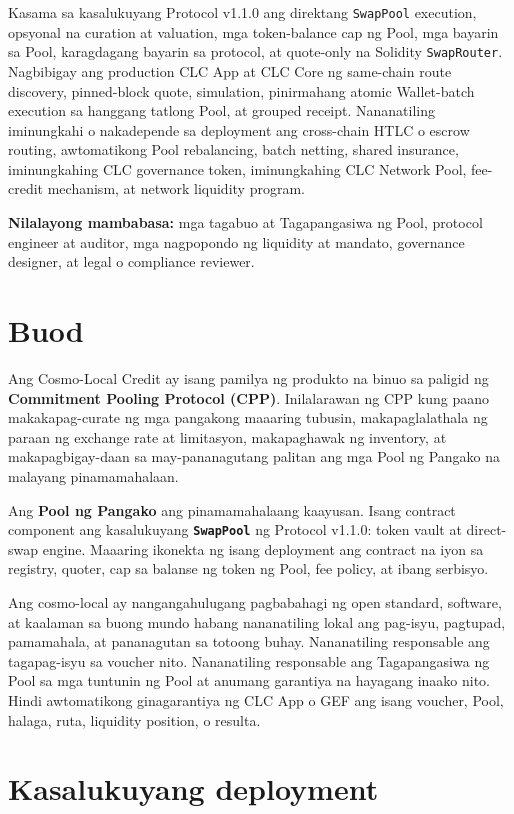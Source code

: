 \documentclass[11pt]{article}
\begin{document}
Kasama sa kasalukuyang Protocol v1.1.0 ang direktang \texttt{SwapPool} execution, opsyonal na curation at valuation, mga token-balance cap ng Pool, mga bayarin sa Pool, karagdagang bayarin sa protocol, at quote-only na Solidity \texttt{SwapRouter}. Nagbibigay ang production CLC App at CLC Core ng same-chain route discovery, pinned-block quote, simulation, pinirmahang atomic Wallet-batch execution sa hanggang tatlong Pool, at grouped receipt. Nananatiling iminungkahi o nakadepende sa deployment ang cross-chain HTLC o escrow routing, awtomatikong Pool rebalancing, batch netting, shared insurance, iminungkahing CLC governance token, iminungkahing CLC Network Pool, fee-credit mechanism, at network liquidity program.

\textbf{Nilalayong mambabasa:} mga tagabuo at Tagapangasiwa ng Pool, protocol engineer at auditor, mga nagpopondo ng liquidity at mandato, governance designer, at legal o compliance reviewer.

\section*{Buod}

Ang Cosmo-Local Credit ay isang pamilya ng produkto na binuo sa paligid ng \textbf{Commitment Pooling Protocol (CPP)}. Inilalarawan ng CPP kung paano makakapag-curate ng mga pangakong maaaring tubusin, makapaglalathala ng paraan ng exchange rate at limitasyon, makapaghawak ng inventory, at makapagbigay-daan sa may-pananagutang palitan ang mga Pool ng Pangako na malayang pinamamahalaan.

Ang \textbf{Pool ng Pangako} ang pinamamahalaang kaayusan. Isang contract component ang kasalukuyang \textbf{\texttt{SwapPool}} ng Protocol v1.1.0: token vault at direct-swap engine. Maaaring ikonekta ng isang deployment ang contract na iyon sa registry, quoter, cap sa balanse ng token ng Pool, fee policy, at ibang serbisyo.

Ang cosmo-local ay nangangahulugang pagbabahagi ng open standard, software, at kaalaman sa buong mundo habang nananatiling lokal ang pag-isyu, pagtupad, pamamahala, at pananagutan sa totoong buhay. Nananatiling responsable ang tagapag-isyu sa voucher nito. Nananatiling responsable ang Tagapangasiwa ng Pool sa mga tuntunin ng Pool at anumang garantiya na hayagang inaako nito. Hindi awtomatikong ginagarantiya ng CLC App o GEF ang isang voucher, Pool, halaga, ruta, liquidity position, o resulta.

\section*{Kasalukuyang deployment}
\end{document}
